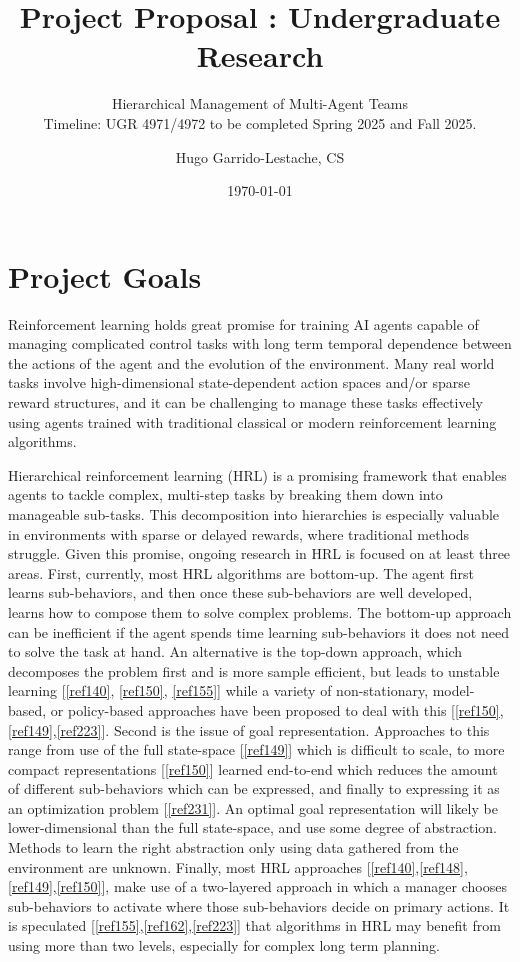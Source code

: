 \documentclass[12pt]{article}
\title{Project Proposal : Undergraduate Research}
\subtitle{Hierarchical Management of Multi-Agent Teams\\ Timeline: UGR 4971/4972 to be completed Spring 2025 and Fall 2025.}
\author{Hugo Garrido-Lestache, CS}
\date{\today}
\begin{document}
\maketitle

\section{Project Goals}
Reinforcement learning holds great promise for training AI agents capable of managing complicated control tasks with long term temporal dependence between the actions of the agent and the evolution of the environment.  Many real world tasks involve high-dimensional state-dependent action spaces and/or sparse reward structures, and it can be challenging to manage these tasks effectively using agents trained with traditional classical or modern reinforcement learning algorithms.

Hierarchical reinforcement learning (HRL) is a promising framework that enables agents to tackle complex, multi-step tasks by breaking them down into manageable sub-tasks.  This decomposition into hierarchies is especially valuable in environments with sparse or delayed rewards, where traditional methods struggle.  Given this promise, ongoing research in HRL is focused on at least three areas.  First, currently, most HRL algorithms are bottom-up. The agent first learns sub-behaviors, and then once these sub-behaviors are well developed, learns how to compose them to solve complex problems. The bottom-up approach can be inefficient if the agent spends time learning sub-behaviors it does not need to solve the task at hand. An alternative is the top-down approach, which decomposes the problem first and is more sample efficient, but leads to unstable learning [\ref{ref140}, \ref{ref150}, \ref{ref155}] while a variety of non-stationary, model-based, or policy-based approaches have been proposed to deal with this [\ref{ref150},\ref{ref149},\ref{ref223}].  Second is the issue of goal representation. Approaches to this range from use of the full state-space [\ref{ref149}] which is difficult to scale, to more compact representations [\ref{ref150}] learned end-to-end which reduces the amount of different sub-behaviors which can be expressed, and finally to expressing it as an optimization problem [\ref{ref231}].  An optimal goal representation will likely be lower-dimensional than the full state-space, and use some degree of abstraction. Methods to learn the right abstraction only using data gathered from the environment are unknown.  Finally, most HRL approaches [\ref{ref140},\ref{ref148},\ref{ref149},\ref{ref150}], make use of a two-layered approach in which a manager chooses sub-behaviors to activate where those sub-behaviors decide on primary actions.  It is speculated [\ref{ref155},\ref{ref162},\ref{ref223}] that algorithms in HRL may benefit from using more than two levels, especially for complex long term planning. 
\end{document}
